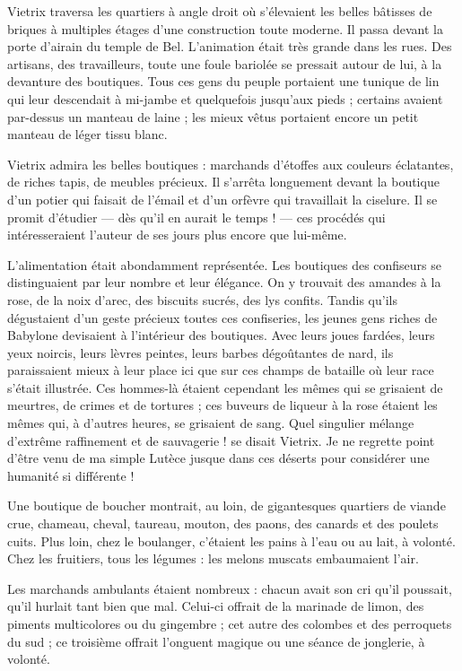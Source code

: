 \documentclass[a4paper, 11pt, oneside, polutonikogreek, french]{article}
\begin{document}
\bigskip
\centerline{\EightStarTaper}
\centerline{\EightStarTaper\EightStarTaper}
\bigskip

Vietrix traversa les quartiers à angle droit où s'élevaient les belles bâtisses de briques à multiples étages d'une construction toute moderne. Il passa devant la porte d'airain du temple de Bel. L'animation était très grande dans les rues. Des artisans, des travailleurs, toute une foule bariolée se pressait autour de lui, à la devanture des boutiques. Tous ces gens du peuple portaient une tunique de lin qui leur descendait à mi-jambe et quelquefois jusqu'aux pieds ; certains avaient par-dessus un manteau de laine ; les mieux vêtus portaient encore un petit manteau de léger tissu blanc.

Vietrix admira les belles boutiques : marchands d'étoffes aux couleurs éclatantes, de riches tapis, de meubles précieux. Il s'arrêta longuement devant la boutique d'un potier qui faisait de l'émail et d'un orfèvre qui travaillait la ciselure. Il se promit d'étudier --- dès qu'il en aurait le temps ! --- ces procédés qui intéresseraient l'auteur de ses jours plus encore que lui-même.

L'alimentation était abondamment représentée. Les boutiques des confiseurs se distinguaient par leur nombre et leur élégance. On y trouvait des amandes à la rose, de la noix d'arec, des biscuits sucrés, des lys confits. Tandis qu'ils dégustaient d'un geste précieux toutes ces confiseries, les jeunes gens riches de Babylone devisaient à l'intérieur des boutiques. Avec leurs joues fardées, leurs yeux noircis, leurs lèvres peintes, leurs barbes dégoûtantes de nard, ils paraissaient mieux à leur place ici que sur ces champs de bataille où leur race s'était illustrée. Ces hommes-là étaient cependant les mêmes qui se grisaient de meurtres, de crimes et de tortures ; ces buveurs de liqueur à la rose étaient les mêmes qui, à d'autres heures, se grisaient de sang. Quel singulier mélange d'extrême raffinement et de sauvagerie ! se disait Vietrix. Je ne regrette point d'être venu de ma simple Lutèce jusque dans ces déserts pour considérer une humanité si différente !

Une boutique de boucher montrait, au loin, de gigantesques quartiers de viande crue, chameau, cheval, taureau, mouton, des paons, des canards et des poulets cuits. Plus loin, chez le boulanger, c'étaient les pains à l'eau ou au lait, à volonté. Chez les fruitiers, tous les légumes : les melons muscats embaumaient l'air.

Les marchands ambulants étaient nombreux : chacun avait son cri qu'il poussait, qu'il hurlait tant bien que mal. Celui-ci offrait de la marinade de limon, des piments multicolores ou du gingembre ; cet autre des colombes et des perroquets du sud ; ce troisième offrait l'onguent magique ou une séance de jonglerie, à volonté.
\end{document}
